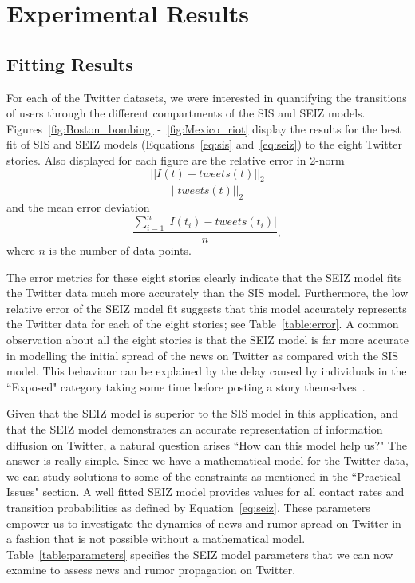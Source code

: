 \section{Experimental Results}
\subsection{Fitting Results}

For each of the Twitter datasets, we were interested in quantifying the transitions of users through the different compartments of the SIS and SEIZ models.
Figures~\ref{fig:Boston_bombing} -~\ref{fig:Mexico_riot} display the results for the best fit of SIS and SEIZ models (Equations~\ref{eq:sis} and~\ref{eq:seiz}) to the eight Twitter stories. Also displayed for each figure are the relative error in 2-norm $$\frac{||I(t) - tweets(t)||_2}{||tweets(t)||_2}$$ and the mean error deviation $$\frac{\sum_{i=1}^n|I(t_i)-tweets(t_i)|}{n},$$  where $n$ is the number of data points.

The error metrics for these eight stories clearly indicate that the SEIZ model fits the Twitter data much more accurately than the SIS model. Furthermore, the low relative error of the SEIZ model fit suggests that this model accurately represents the Twitter data for each of the eight stories; see Table~\ref{table:error}. A common observation about all the eight stories is that the SEIZ model is far more accurate in modelling the initial spread of the news on Twitter as compared with the SIS model. This behaviour can be explained by the delay caused by individuals in the ``Exposed" category taking some time before posting a story themselves~\cite{powerofgoodidea:2006}.

Given that the SEIZ model is superior to the SIS model in this application, and that the SEIZ model demonstrates an accurate representation of information diffusion on Twitter, a natural question arises ``How can this model help us?" The answer is really simple. Since we have a mathematical model for the Twitter data, we can study solutions to some of the constraints as mentioned in the ``Practical Issues" section. A well fitted SEIZ model provides values for all contact rates and transition probabilities as defined by Equation~\ref{eq:seiz}. These parameters empower us to investigate the dynamics of news and rumor spread on Twitter in a fashion that is not possible without a mathematical model. Table~\ref{table:parameters} specifies the SEIZ model parameters that we can now examine to assess news and rumor propagation on Twitter.



